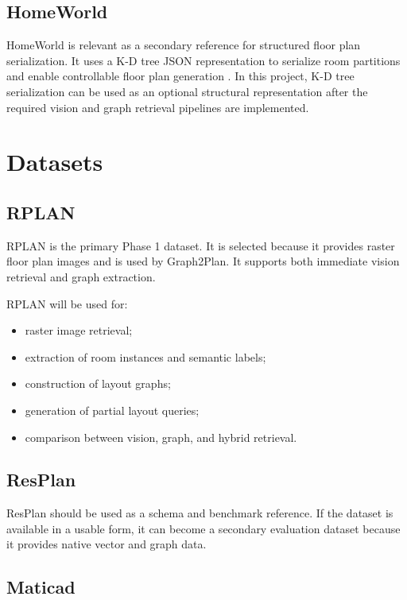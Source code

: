 \documentclass[11pt,a4paper]{article}
\begin{document}
\subsection{HomeWorld}

HomeWorld is relevant as a secondary reference for structured floor plan serialization. It uses a K-D tree JSON representation to serialize room partitions and enable controllable floor plan generation \cite{homeworld}. In this project, K-D tree serialization can be used as an optional structural representation after the required vision and graph retrieval pipelines are implemented.

\section{Datasets}

\subsection{RPLAN}

RPLAN is the primary Phase 1 dataset. It is selected because it provides raster floor plan images and is used by Graph2Plan. It supports both immediate vision retrieval and graph extraction.

RPLAN will be used for:
\begin{itemize}
    \item raster image retrieval;
    \item extraction of room instances and semantic labels;
    \item construction of layout graphs;
    \item generation of partial layout queries;
    \item comparison between vision, graph, and hybrid retrieval.
\end{itemize}

\subsection{ResPlan}

ResPlan should be used as a schema and benchmark reference. If the dataset is available in a usable form, it can become a secondary evaluation dataset because it provides native vector and graph data.

\subsection{Maticad}
\end{document}
